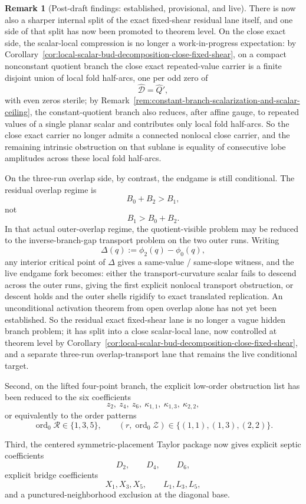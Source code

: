 \documentclass[11pt,a4paper]{amsart}
\theoremstyle{plain}
\theoremstyle{definition}
\newtheorem{remark}[theorem]{Remark}
\begin{document}
\begin{remark}[Post-draft findings: established, provisional, and live]
There is now also a sharper internal split of the exact fixed-shear residual
lane itself, and one side of that split has now been promoted to theorem
level. On the close exact side, the scalar-local compression is no longer a
work-in-progress expectation: by
Corollary~\ref{cor:local-scalar-bud-decomposition-close-fixed-shear}, on a
compact nonconstant quotient branch the close exact repeated-value carrier is
a finite disjoint union of local fold half-arcs, one per odd zero of
\[
\widehat{\mathcal D}=\widehat Q',
\]
with even zeros sterile; by
Remark~\ref{rem:constant-branch-scalarization-and-scalar-ceiling}, the
constant-quotient branch also reduces, after affine gauge, to repeated values
of a single planar scalar and contributes only local fold half-arcs. So the
close exact carrier no longer admits a connected nonlocal close carrier, and
the remaining intrinsic obstruction on that sublane is equality of
consecutive lobe amplitudes across these local fold half-arcs.

On the three-run overlap side, by contrast, the endgame is still conditional.
The residual overlap regime is
\[
B_0+B_2>B_1,
\]
not
\[
B_1>B_0+B_2.
\]
In that actual outer-overlap regime, the quotient-visible problem may be
reduced to the inverse-branch-gap transport problem on the two outer runs.
Writing
\[
\Delta(q):=\phi_2(q)-\phi_0(q),
\]
any interior critical point of $\Delta$ gives a same-value / same-slope
witness, and the live endgame fork becomes: either the transport-curvature
scalar fails to descend across the outer runs, giving the first explicit
nonlocal transport obstruction, or descent holds and the outer shells rigidify
to exact translated replication. An unconditional activation theorem from open
overlap alone has not yet been established. So the residual exact fixed-shear
lane is no longer a vague hidden branch problem; it has split into a close
scalar-local lane, now controlled at theorem level by
Corollary~\ref{cor:local-scalar-bud-decomposition-close-fixed-shear}, and a
separate three-run overlap-transport lane that remains the live conditional
target.

Second, on the lifted four-point branch, the explicit low-order obstruction
list has been reduced to the six coefficients
\[
z_2,\ z_4,\ z_6,\ \kappa_{1,1},\ \kappa_{1,3},\ \kappa_{2,2},
\]
or equivalently to the order patterns
\[
\operatorname{ord}_0\mathcal R\in\{1,3,5\},
\qquad
(r,\operatorname{ord}_0\mathcal Z)\in\{(1,1),(1,3),(2,2)\}.
\]

Third, the centered symmetric-placement Taylor package now gives explicit septic
coefficients
\[
D_2,\qquad D_4,\qquad D_6,
\]
explicit bridge coefficients
\[
X_1,X_3,X_5,\qquad L_1,L_3,L_5,
\]
and a punctured-neighborhood exclusion at the diagonal base.


\end{remark}
\end{document}
